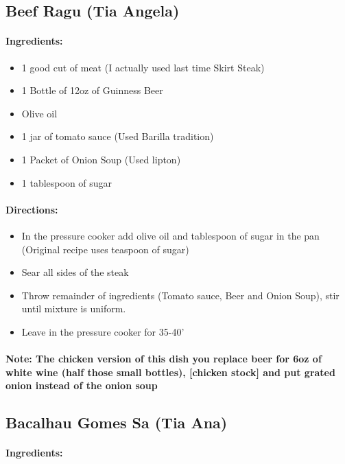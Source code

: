 \documentclass{article}
\begin{document}
\subsection{Beef Ragu (Tia Angela)}

\paragraph{Ingredients:}

\begin{itemize}
	\item 1 good cut of meat (I actually used last time Skirt Steak)
	\item 1 Bottle of 12oz of Guinness Beer
	\item Olive oil
	\item 1 jar of tomato sauce (Used Barilla tradition)
	\item 1 Packet of Onion Soup (Used lipton)
	\item 1 tablespoon of sugar
\end{itemize}

\paragraph{Directions:}
\begin{itemize}
	\item In the pressure cooker add olive oil and tablespoon of sugar in the pan (Original recipe uses teaspoon of sugar)
	\item Sear all sides of the steak
	\item Throw remainder of ingredients (Tomato sauce, Beer and Onion Soup), stir until mixture is uniform.
	\item Leave in the pressure cooker for 35-40'
\end{itemize}

\paragraph{Note: The chicken version of this dish you replace beer for 6oz of white wine (half those small bottles), [chicken stock] and put grated onion instead of the onion soup}

\subsection{Bacalhau Gomes Sa (Tia Ana)}

\paragraph{Ingredients:}
\end{document}
